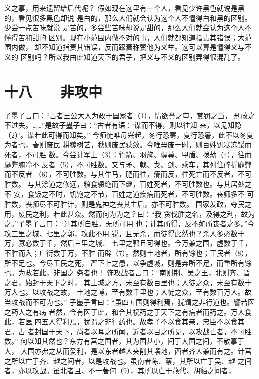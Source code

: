 \documentclass[12pt,UTF8]{ctexbook}
\begin{document}
义之事，用来遗留给后代呢？ 
假如现在这里有一个人，看见少许黑色就说是黑的，看见很多黑色却说 
是白的，那么人们就会认为这个人不懂得白和黑的区别。少尝一点苦味就说 
是苦的，多尝些苦味却说是甜的，那么人们就会认为这个人不懂得苦和甜的 
区别。现在小范围内做不对的事，人们就都知道指责其错误；大范围内做， 
却不知道指责其错误，反而跟着称赞他为义举。这可以算是懂得义与不义的 
区别吗？所以我由此知道天下的君子，把义与不义的区别弄得很混乱了。 


\chapter{十八　　非攻中}

子墨子言曰：“古者王公大人为政于国家者（1），情欲誉之审，赏罚之当， 
刑政之不过失。……”是故子墨子曰：“古者有语：‘谋而不得，则以往知 
来，以见知隐（2）’。谋若此可得而知矣。” 
今师徒唯毋兴起，冬行恐寒，夏行恐暑，此不以冬夏为者也，春则废民 
耕稼树艺，秋则废民获敛。今唯毋废一时，则百姓饥寒冻馁而死者，不可胜 
数。今尝计军上（3）：竹箭、羽旄、幄幕、甲盾、拨劫（4），往而靡弊腑冷不 
反者（5），不可胜数。又与矛、戟、戈、剑、乘车，其列住碎折靡弊而不反者 
（6），不可胜数。与其牛马，肥而往，瘠而反，往死亡而不反者，不可胜数。 
与其涂道之修远，粮食辍绝而下继，百姓死者，不可胜数也。与其居处之不 
安，食饭之不时，饥饱之不节，百姓之道疾病而死者，不可胜数。丧师多不 
可胜数，丧师尽不可胜计，则是鬼神之丧其主后，亦不可胜数。 
国家发政，夺民之用，废民之利，若此甚众。然而何为为之？曰：“我 
贪伐胜之名，及得之利，故为之。”子墨子言曰：“计其所自胜，无所可用 
也；计其所得，反不如所丧者之多。”今攻三里之城、七里之郭，攻此不用 
锐，且无杀，而徒得此然也？杀人多必数于万，寡必数于千，然后三里之城、 
七里之郭且可得也。今万兼之国，虚数于千，不胜而入；广衍数于万，不胜 
而辟（7）。然则土地者，所有馀也；王民者（8），所不足也。今尽王民之死， 
严下上之患，以争虚城，则是弃所不足，而重所有馀也。为政若此，非国之 
务者也！ 
饰攻战者言曰：“南则荆、吴之王，北则齐、晋之君，始封于天下之时， 
其土城之方，未至有数百里也；人徒之众，未至有数十万人也。以攻战之故， 
土地之博，至有数千里也；人徒之众，至有数百万人。故当攻战而不可为也。” 
子墨子言曰：“虽四五国则得利焉，犹谓之非行道也。譬若医之药人之有病 
者然，今有医于此，和合其祝药之于天下之有病者而药之。万人食此，若医 
四五人得利焉，犹谓之非行药也。故孝子不以食其亲，忠臣不以食其君。古 
者封国于天下，尚者以耳之所闻，近者以目之所见，以攻战亡者，不可胜数。” 
何以知其然也？东方有莒之国者，其为国甚小，间于大国之间，不敬事于大， 
大国亦弗之从而爱利，是以东者越人夹削其壤地，西者齐人兼而有之。计莒 
之所以亡于齐、越之间者，以是攻战也。虽南者陈、蔡，其所以亡于吴、越 
之间者，亦以攻战。虽北者且、不一著何（9），其所以亡于燕代、胡貊之间者， 
\end{document}
